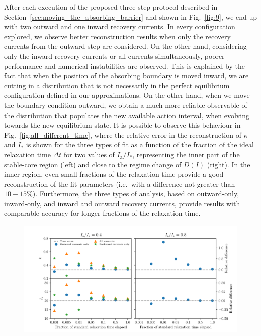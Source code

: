 {After each execution of the proposed three-step protocol described in Section~\ref{sec:moving_the_absorbing_barrier} and shown in Fig.~\ref{fig:9}, we end up with two outward and one inward recovery currents. In every configuration explored, we observe better reconstruction results when only the recovery currents from the outward step are considered. On the other hand, considering only the inward recovery currents or all currents simultaneously, poorer performance and numerical instabilities are observed. This is explained by the fact that when the position of the absorbing boundary is moved inward, we are cutting in a distribution that is not necessarily in the perfect equilibrium configuration defined in our approximations. On the other hand, when we move the boundary condition outward, we obtain a much more reliable observable of the distribution that populates the new available action interval, when evolving towards the new equilibrium state. It is possible to observe this behaviour in Fig.~\ref{fig:all_different_time}, where the relative error in the reconstruction of $\kappa$ and $I_\ast$ is shown for the three types of fit as a function of the fraction of the ideal relaxation time $\Delta t$ for two values of $I_\mathrm{a}/I_\ast$, representing the inner part of the stable-core region (left) and close to the regime change of $D(I)$ (right). In the inner region, even small fractions of the relaxation time provide a good reconstruction of the fit parameters {(i.e.\ with a difference not greater than $10-15\%$)}. Furthermore, the three types of analysis, based on outward-only, inward-only, and inward and outward recovery currents, provide results with comparable accuracy for longer fractions of the relaxation time.  
%
\begin{figure}[htp]
    \centering
    \includegraphics[width=\textwidth]{4_probing_the_diffusive_behavior/figs/final/better_plot.pdf}

\end{figure}}
